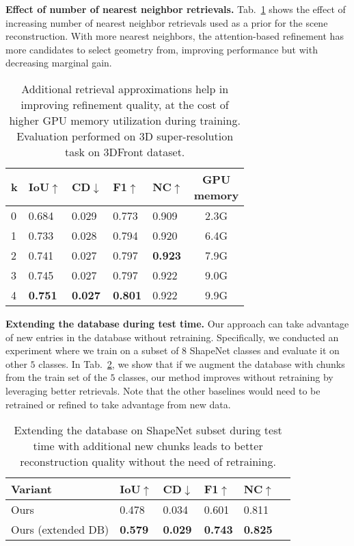 \smallskip
\noindent \textbf{Effect of number of nearest neighbor retrievals.}
Tab.~\ref{tab:nn_ablation} shows the effect of increasing number of nearest neighbor retrievals used as a prior for the scene reconstruction.
With more nearest neighbors, the attention-based refinement has more candidates to select geometry from, improving  performance but with decreasing marginal gain.
\begin{table}
\centering
\small
\begin{tabular}{|l|l|l|l|l|c|} 
\hline
k & IoU$\uparrow$ & CD$\downarrow$ & F1$\uparrow$ & NC$\uparrow$ & \makecell{GPU\\memory}  \\ 
\hline
0 & 0.684 & 0.029 & 0.773 & 0.909 & 2.3G  \\ 
1 & 0.733 & 0.028 & 0.794 & 0.920  &  6.4G  \\ 
2 & 0.741 & 0.027 & 0.797 & \textbf{0.923}  &  7.9G \\ 
3 & 0.745 & 0.027 & 0.797 & 0.922  & 9.0G\\ 
\hline
4 & \textbf{0.751} & \textbf{0.027} & \textbf{0.801} & 0.922 & 9.9G \\
\hline
\end{tabular}
\vspace{-0.15cm}
\caption{Additional retrieval approximations help in improving refinement quality, at the cost of higher GPU memory utilization during training. Evaluation performed on 3D super-resolution task on 3DFront dataset.}
\label{tab:nn_ablation}
\vspace{-0.25cm}
\end{table}

\smallskip
\noindent \textbf{Extending the database during test time.}
Our approach can take advantage of new entries in the database without retraining.
Specifically, we conducted an experiment where we train on a subset of $8$ ShapeNet classes and evaluate it on other $5$ classes.
In Tab.~\ref{tab:unseen_classes}, we show that if we augment the database with chunks from the train set of the $5$ classes, our method improves without retraining by leveraging better retrievals.
Note that the other baselines would need to be retrained or refined to take advantage from new data.

\begin{table}
\centering
\small
\begin{tabular}{|l|l|l|l|l|l|} 
\hline
Variant & IoU$\uparrow$ & CD$\downarrow$ & F1$\uparrow$ & NC$\uparrow$ \\
\hline
Ours  & 0.478 & 0.034 & 0.601 & 0.811 \\
Ours (extended DB) & \textbf{0.579} & \textbf{0.029} & \textbf{0.743} & \textbf{0.825} \\
\hline
\end{tabular}
\vspace{-0.15cm}
\caption{Extending the database on ShapeNet subset during test time with additional new chunks leads to better reconstruction quality without the need of retraining.}
\label{tab:unseen_classes}
\vspace{-0.25cm}
\end{table}


